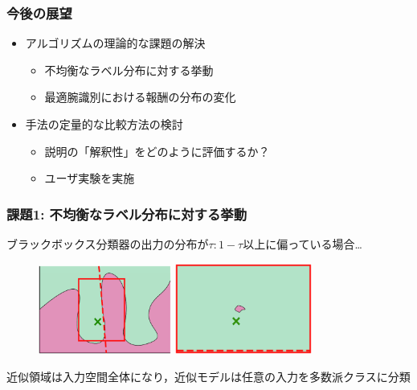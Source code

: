 \documentclass[aspectratio=169]{slide-ja}
\begin{document}
\begin{frame}
  \frametitle{今後の展望}
  \begin{itemize}
    \item アルゴリズムの理論的な課題の解決
          \begin{itemize}
            \item 不均衡なラベル分布に対する挙動
            \item 最適腕識別における報酬の分布の変化
          \end{itemize}
          \bigskip
    \item 手法の定量的な比較方法の検討
          \begin{itemize}
            \item 説明の「解釈性」をどのように評価するか？
            \item ユーザ実験を実施
          \end{itemize}
  \end{itemize}
\end{frame}

\begin{frame}
  \frametitle{課題1: 不均衡なラベル分布に対する挙動}
  ブラックボックス分類器の出力の分布が$\tau:1-\tau$以上に偏っている場合\dots
  \begin{figure}
    \centering
    \includegraphics[width=0.39\textwidth]{visual-rlime3}
    \hspace{1em}
    \includegraphics[width=0.4\textwidth]{visual-rlime-imbalanced}
  \end{figure}
  近似領域は入力空間全体になり，近似モデルは任意の入力を多数派クラスに分類
\end{frame}
\end{document}
